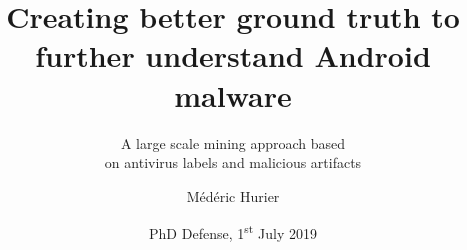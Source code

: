 \title[Creating better malware ground truth for Android]{
    Creating better ground truth to \\
    further understand Android malware
}
\subtitle{
    A large scale mining approach based \\
    on antivirus labels and malicious artifacts
}
\author[PhD -- Médéric Hurier -- University of Luxembourg]{Médéric Hurier}
\date[1\textsuperscript{st} July 2019]{PhD Defense, 1\textsuperscript{st} July 2019}
